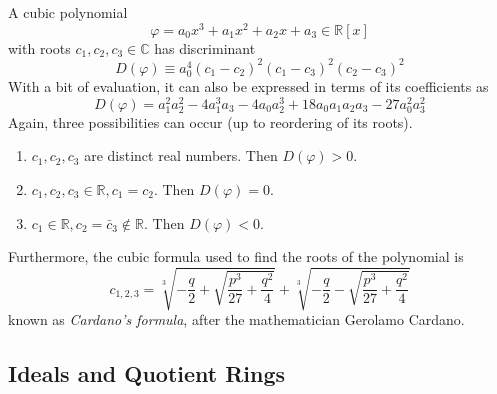 \documentclass{article}
\begin{document}
      \begin{lemma}
        A cubic polynomial 
        \begin{equation}
          \varphi = a_0 x^3 + a_1 x^2 + a_2 x + a_3 \in \mathbb{R}[x]
        \end{equation}
        with roots $c_1, c_2, c_3 \in \mathbb{C}$ has discriminant
        \begin{equation}
          D(\varphi) \equiv a_0^4 (c_1 - c_2)^2 (c_1 - c_3)^2 (c_2 - c_3)^2
        \end{equation}
        With a bit of evaluation, it can also be expressed in terms of its coefficients as
        \begin{equation}
          D(\varphi) = a_1^2 a_2^2 - 4a_1^3 a_3 - 4a_0 a_2^3 + 18 a_0 a_1 a_2 a_3 - 27 a_0^2 a_3^2
        \end{equation}
        Again, three possibilities can occur (up to reordering of its roots). 
        \begin{enumerate}
            \item $c_1, c_2, c_3$ are distinct real numbers. Then $D(\varphi) > 0$. 
            \item $c_1, c_2, c_3 \in \mathbb{R}, c_1 = c_2$. Then $D(\varphi) = 0$. 
            \item $c_1 \in \mathbb{R}, c_2 = \bar{c}_3 \not\in \mathbb{R}$. Then $D(\varphi) < 0$. 
        \end{enumerate}
        Furthermore, the cubic formula used to find the roots of the polynomial is 
        \begin{equation}
          c_{1, 2, 3} = \sqrt[3]{-\frac{q}{2} + \sqrt{\frac{p^3}{27} + \frac{q^2}{4}}} + \sqrt[3]{-\frac{q}{2} - \sqrt{\frac{p^3}{27} + \frac{q^2}{4}}}
        \end{equation}
        known as \textit{Cardano's formula}, after the mathematician Gerolamo Cardano. 
      \end{lemma}

  \subsection{Ideals and Quotient Rings}
\end{document}
